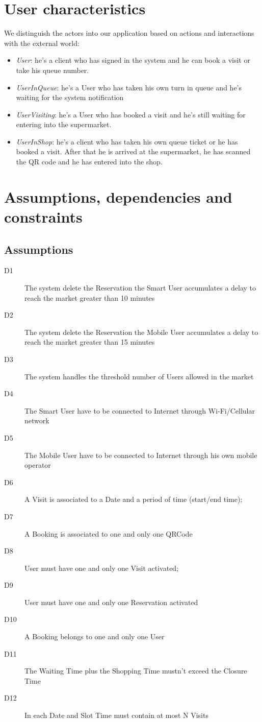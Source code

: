 \section{User characteristics}
We distinguish the actors into our application based on actions and interactions with the external world:

\begin{itemize}
\item \textit{User}: he’s a client who has signed in the system and he can book a visit or take his queue number.
\item \textit{UserInQueue}: he’s a User who has taken his own turn in queue and he’s waiting for the system notification
\item \textit{UserVisiting}: he’s a User who has booked a visit and he’s still waiting for entering into the supermarket.
\item \textit{UserInShop}: he’s a client who has taken his own queue ticket or he has booked a visit. After that he is arrived at the supermarket, he has scanned the QR code and he has entered into the shop.
\end{itemize}


\section{Assumptions, dependencies and constraints}
\subsection{Assumptions}
\begin{description}
    \item[D1] The system delete the Reservation the Smart User accumulates a delay to reach the market greater than 10 minutes
    \item[D2] The system delete the Reservation the Mobile User accumulates a delay to reach the market greater than 15 minutes
    \item[D3] The system handles the threshold number of Users allowed in the market
    \item[D4] The Smart User have to be connected to Internet through Wi-Fi/Cellular network
    \item[D5] The Mobile User have to be connected to Internet through his own mobile operator
    \item[D6] A Visit is associated to a Date and a period of time (start/end time);
    \item[D7] A Booking is associated to one and only one QRCode
    \item[D8] User must have one and only one Visit activated;
    \item[D9] User must have one and only one Reservation activated
    \item[D10] A Booking belongs to one and only one User
    \item[D11] The Waiting Time plus the Shopping Time mustn’t exceed the Closure Time
    \item[D12] In each Date and Slot Time must contain at most N Visits
\end{description}


